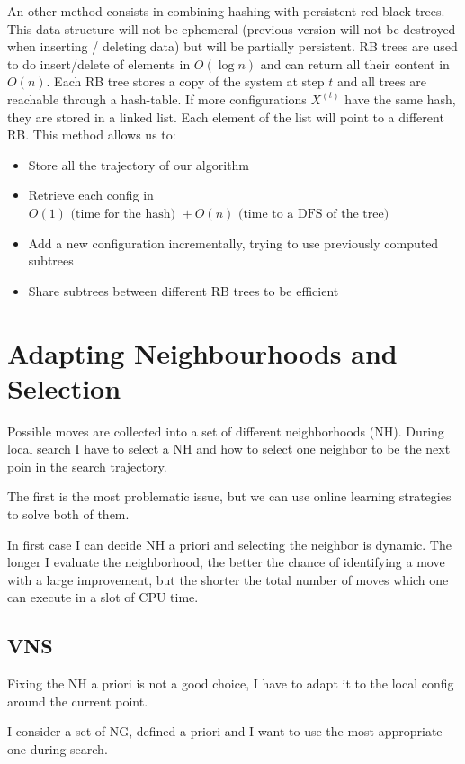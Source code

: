 \documentclass[11pt]{article}
\begin{document}
An other method consists in combining hashing with persistent red-black trees. This data structure will not be ephemeral (previous version will not be destroyed when inserting / deleting data) but will be partially persistent. RB trees are used to do insert/delete of elements in $O(\log n)$ and can return all their content in $O(n)$. Each RB tree stores a copy of the system at step $t$ and all trees are reachable through a hash-table. If more configurations $X^{(t)}$ have the same hash, they are stored in a linked list. Each element of the list will point to a different RB. This method allows us to:
\begin{itemize}
\item{Store all the trajectory of our algorithm}
\item{Retrieve each config in $O(1) \text{ (time for the hash) } + O(n) \text{ (time to a DFS of the tree) }$ }
\item{Add a new configuration incrementally, trying to use previously computed subtrees}
\item{Share subtrees between different RB trees to be efficient}
\end{itemize}

\section{Adapting Neighbourhoods and Selection}
Possible moves are collected into a set of different
neighborhoods (NH). During local search I have to select a 
NH and how to select one neighbor to be the next poin in the search trajectory.

The first is the most problematic issue, but we can use online learning strategies to solve both of them.

In first case I can decide NH a priori and selecting the neighbor is dynamic. The longer I evaluate the neighborhood, the better the chance of
identifying a move with a large improvement, but the shorter the total number of moves which one can execute in a slot of CPU time.

\subsection{VNS}
Fixing the NH a priori is not a good choice, I have to adapt it to the local config around the current point. 

I consider a set of NG, defined a priori and I want to use the most appropriate one during search. 
\end{document}
